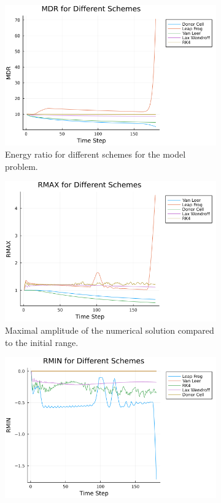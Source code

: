 \begin{figure}[h]
    \begin{subfigure}[b]{0.3\textwidth}
        \includegraphics[width=\textwidth]{./images/rectangle-MDR.png}
        \caption{Energy ratio for different schemes for the model problem.}
        \label{fig:mdr}
    \end{subfigure}
    \hfill
    \begin{subfigure}[b]{0.3\textwidth}
        \includegraphics[width=\textwidth]{./images/rectangle-RMAX.png}
        \caption{Maximal amplitude of the numerical solution compared to the initial range.}
        \label{fig:rmax}
    \end{subfigure}
    \hfill
    \begin{subfigure}[b]{0.3\textwidth}
        \includegraphics[width=\textwidth]{./images/rectangle-RMIN.png}

\end{subfigure}
\end{figure}
